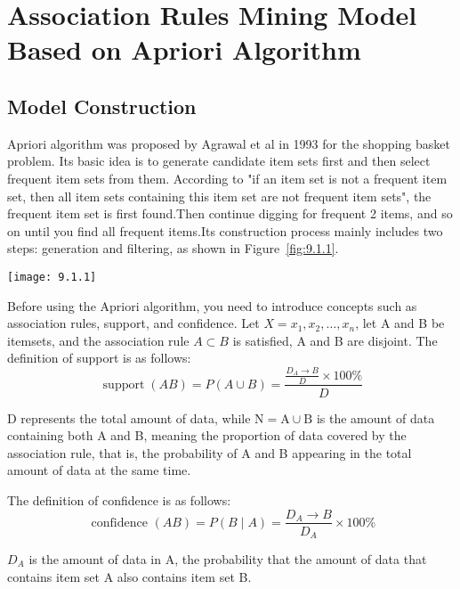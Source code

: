 \documentclass[../mcmpaper]{subfiles}
\begin{document}
    \section{Association Rules Mining Model Based on Apriori Algorithm}
    \subsection{Model Construction}
    Apriori algorithm was proposed by Agrawal et al in 1993 for the shopping basket problem\cite{8}. Its basic idea is to generate candidate item sets first and then select frequent item sets from them. According to "if an item set is not a frequent item set, then all item sets containing this item set are not frequent item sets", the frequent item set is first found.Then continue digging for frequent 2 items, and so on until you find all frequent items.Its construction process mainly includes two steps: generation and filtering, as shown in Figure~\ref{fig:9.1.1}.\\[1em]
    \begin{minipage}{1.0\linewidth}
    \centering
    \texttt{[image: 9.1.1]}
    \label{fig:9.1.1}
    \end{minipage}
    \par
    Before using the Apriori algorithm, you need to introduce concepts such as association rules, support, and confidence. Let $X={x_1 ,x_2 ,\dots,x_n}$, let A and B be itemsets, and the association rule $A\subset B$ is satisfied, A and B are disjoint. The definition of support is as follows:
    \begin{equation}
    \operatorname{support}(A B)=P(A \cup B)=\frac{\frac{D_{A} \rightarrow B}{D} \times 100 \%}{D}
    \end{equation}
    \par
    D represents the total amount of data, while $\mathrm{N}=\mathrm{A} \cup \mathrm{B}$ is the amount of data containing both A and B, meaning the proportion of data covered by the association rule, that is, the probability of A and B appearing in the total amount of data at the same time.
    \par
    The definition of confidence is as follows:
    \begin{equation}
    \text { confidence }(A B)=P(B \mid A)=\frac{D_{A} \rightarrow B}{D_{A}} \times 100 \%
    \end{equation}
    \par
    $D_{A}$ is the amount of data in A, the probability that the amount of data that contains item set A also contains item set B.
\end{document}
